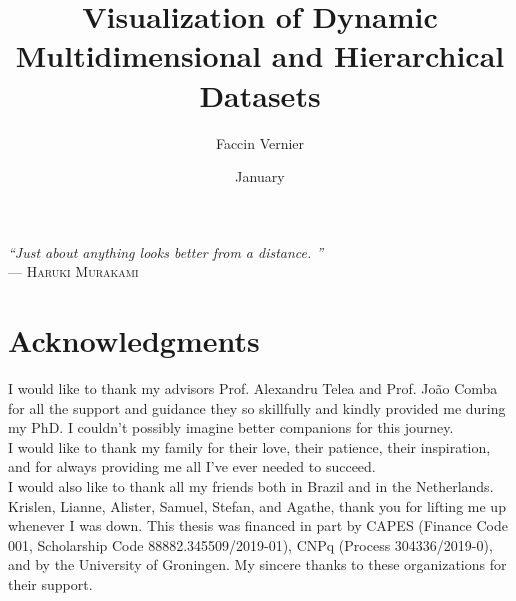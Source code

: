 \documentclass[ppgc,tese,english]{iiufrgs}
\title{Visualization of Dynamic Multidimensional and Hierarchical Datasets}
\author{Faccin Vernier}{Eduardo}
\date{January}{2022}
\begin{document}
\maketitle

\clearpage
\begin{flushright}
\mbox{}\vfill
{\sffamily\itshape
``Just about anything looks better from a distance.
''\\}
--- \textsc{Haruki Murakami}
\end{flushright}

\chapter*{Acknowledgments}
I would like to thank my advisors Prof. Alexandru Telea and Prof. Jo\~{a}o Comba for all the support and guidance they so skillfully and kindly provided me during my PhD. I couldn't possibly imagine better companions for this journey.
\\
I would like to thank my family for their love, their patience, their inspiration, and for always providing me all I've ever needed to succeed.
\\
I would also like to thank all my friends both in Brazil and in the Netherlands. Krislen, Lianne, Alister, Samuel, Stefan, and Agathe, thank you for lifting me up whenever I was down.
\bigbreak
This thesis was financed in part by CAPES (Finance Code 001, Scholarship Code 88882.345509/2019-01), CNPq (Process 304336/2019-0), and by the University of Groningen. 
My sincere thanks to these organizations for their support.
\end{document}
